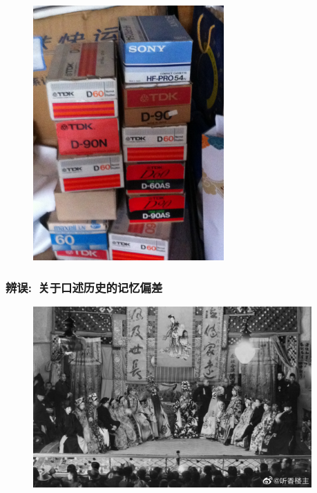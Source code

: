 \documentclass[cjk,slidestop,compress,mathserif,blue]{beamer}
\begin{document}
\frame
{
	\frametitle{}
\begin{figure}[h!]
\centering
\vspace{-0.15in}
\includegraphics[height=0.45\textwidth,width=0.65\textwidth,angle=270, clip]{Figures/PekOpe_Wu-5.jpg}
\label{Wu_xiaoru-4}
\end{figure}
}

\frame
{
	\frametitle{辨误:~关于口述历史的记忆偏差}
\begin{figure}[h!]
\centering
\vspace{-0.10in}
\includegraphics[height=0.65\textwidth,width=0.95\textwidth, clip]{Figures/PekOpe_His-7.jpg}
\label{History-7}
\end{figure}
}
\end{document}
